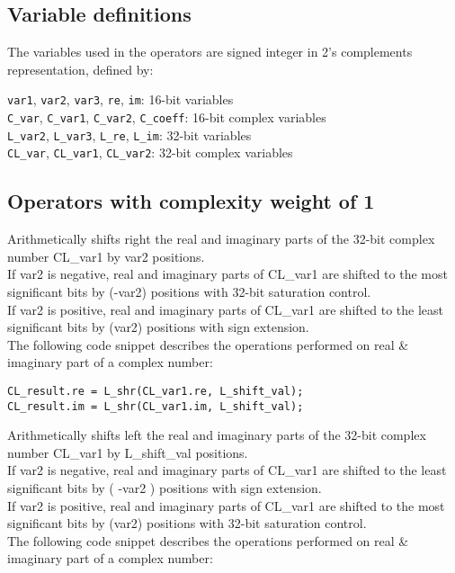 \subsection{Variable definitions}

The variables used in the operators are signed integer in 2's complements representation, defined by:

{\tt var1}, {\tt var2}, {\tt var3}, {\tt re}, {\tt im}: 16-bit variables\\
{\tt C\_var}, {\tt C\_var1}, {\tt C\_var2}, {\tt C\_coeff}: 16-bit complex variables\\
{\tt L\_var2}, {\tt L\_var3}, {\tt L\_re}, {\tt L\_im}: 32-bit variables\\
{\tt CL\_var}, {\tt CL\_var1}, {\tt CL\_var2}: 32-bit complex variables

\subsection{Operators with complexity weight of 1}


Arithmetically shifts right the real and imaginary parts of the 32-bit complex number CL\_var1 by var2 positions.\\
If var2 is negative, real and imaginary parts of CL\_var1 are shifted to the most significant bits by (-var2) positions with 32-bit saturation control.\\
If var2 is positive, real and imaginary parts of CL\_var1 are shifted to the least significant bits by (var2) positions with sign extension.\\
The following code snippet describes the operations performed on real \& imaginary part of a complex number:

{\tt {}CL\_result.re = L\_shr(CL\_var1.re, L\_shift\_val);\\
CL\_result.im = L\_shr(CL\_var1.im, L\_shift\_val);\\
}


Arithmetically shifts left the real and imaginary parts of the 32-bit complex number CL\_var1 by L\_shift\_val positions.\\
If var2 is negative, real and imaginary parts of CL\_var1 are shifted to the least significant bits by ( -var2 ) positions with sign extension.\\
If var2 is positive, real and imaginary parts of CL\_var1 are shifted to the most significant bits by (var2) positions with 32-bit saturation control.\\
The following code snippet describes the operations performed on real \& imaginary part of a complex number:


